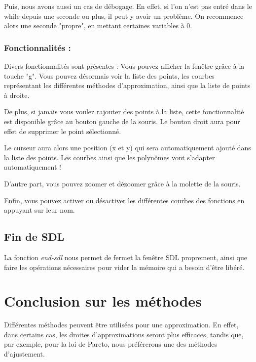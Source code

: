 \documentclass[letter]{article}
\begin{document}
Puis, nous avons aussi un cas de débogage. En effet, si l'on n'est pas entré dans le while depuis une seconde ou plus, il peut y avoir un problème. On recommence alors une seconde "propre", en mettant certaines variables à 0.








\subsubsection{Fonctionnalités :}
\label{sec:orgc331462}

Divers fonctionnalités sont présentes :
Vous pouvez afficher la fenêtre grâce à la touche "g". Vous pouvez désormais voir la liste des points, les courbes représentant les différentes méthodes d'approximation, ainsi que la liste de points à droite.

De plus, si jamais vous voulez rajouter des points à la liste, cette fonctionnalité est disponible grâce au bouton gauche de la souris. Le bouton droit aura pour effet de supprimer le point sélectionné.

Le curseur aura alors une position (x et y) qui sera automatiquement ajouté dans la liste des points. Les courbes ainsi que les polynômes vont s'adapter automatiquement !

D'autre part, vous pouvez zoomer et dézoomer grâce à la molette de la souris.

Enfin, vous pouvez activer ou désactiver les différentes courbes des fonctions en appuyant sur leur nom. 


\subsection{Fin de SDL}
\label{sec:orgd1e36bf}

La fonction \emph{end-sdl} nous permet de fermet la fenêtre SDL proprement, ainsi que faire les opérations nécessaires pour vider la mémoire qui a besoin d'être libéré.


\section{Conclusion sur les méthodes}
\label{sec:orgb8f9874}

Différentes méthodes peuvent être utilisées pour une approximation. En effet, dans certains cas, les droites d'approximations seront plus efficaces, tandis que, par exemple, pour la loi de Pareto, nous préférerons une des méthodes d'ajustement.
\end{document}
